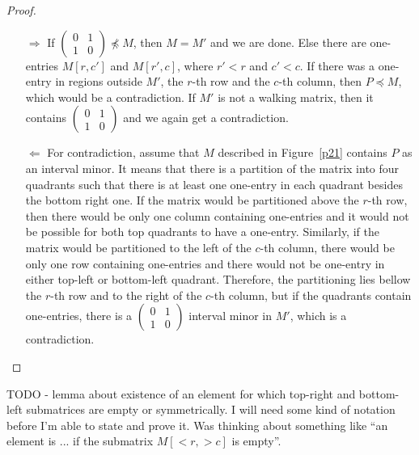 \documentclass[12pt,a4paper]{report}
\begin{document}
\begin{proof}
\begin{itemize}
\item[$\Rightarrow$] If $\left(\begin{smallmatrix}0&1\\1&0\end{smallmatrix}\right)\not\preceq M$, then $M=M'$ and we are done. Else there are one-entries $M[r,c']$ and $M[r',c]$, where $r'<r$ and $c'<c$. If there was a one-entry in regions outside $M'$, the $r$-th row and the $c$-th column, then $P\preceq M$, which would be a contradiction. If $M'$ is not a walking matrix, then it contains $\left(\begin{smallmatrix}0&1\\1&0\end{smallmatrix}\right)$ and we again get a contradiction.
\item[$\Leftarrow$] For contradiction, assume that $M$ described in Figure~\ref{p21} contains $P$ as an interval minor. It means that there is a partition of the matrix into four quadrants such that there is at least one one-entry in each quadrant besides the bottom right one. If the matrix would be partitioned above the $r$-th row, then there would be only one column containing one-entries and it would not be possible for both top quadrants to have a one-entry. Similarly, if the matrix would be partitioned to the left of the $c$-th column, there would be only one row containing one-entries and there would not be one-entry in either top-left or bottom-left quadrant. Therefore, the partitioning lies bellow the $r$-th row and to the right of the $c$-th column, but if the quadrants contain one-entries, there is a $\left(\begin{smallmatrix}0&1\\1&0\end{smallmatrix}\right)$ interval minor in $M'$, which is a contradiction.
\end{itemize}
\end{proof}
\begin{lemma}
\label{lemma1}
TODO - lemma about existence of an element for which top-right and bottom-left submatrices are empty or symmetrically. I will need some kind of notation before I'm able to state and prove it. Was thinking about something like ``an element is ... if the submatrix $M[<r,>c]$ is empty''.
\end{lemma}
\end{document}
